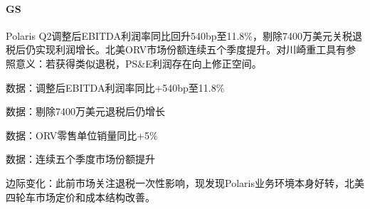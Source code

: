 \documentclass[11pt]{ctexart}
\begin{document}
\paragraph{GS} Polaris Q2调整后EBITDA利润率同比回升540bp至11.8\%，剔除7400万美元关税退税后仍实现利润增长。北美ORV市场份额连续五个季度提升。对川崎重工具有参照意义：若获得类似退税，PS\&E利润存在向上修正空间。
{\small\color{refgray}数据：调整后EBITDA利润率同比+540bp至11.8\%\par}
{\small\color{refgray}数据：剔除7400万美元退税后仍增长\par}
{\small\color{refgray}数据：ORV零售单位销量同比+5\%\par}
{\small\color{refgray}数据：连续五个季度市场份额提升\par}
{\small\color{refgray}边际变化：此前市场关注退税一次性影响，现发现Polaris业务环境本身好转，北美四轮车市场定价和成本结构改善。\par}
\end{document}
